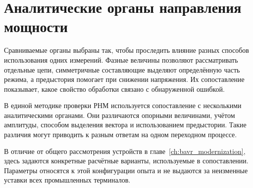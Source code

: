 \section{Аналитические органы направления мощности}
\label{sec:ch5_analytical_organs}

Сравниваемые органы выбраны так, чтобы проследить влияние разных
способов использования одних измерений. Фазные величины позволяют
рассматривать отдельные цепи, симметричные составляющие выделяют
определённую часть режима, а предыстория помогает при снижении
напряжения. Их сопоставление показывает, какое свойство обработки
связано с обнаруженной ошибкой.

{}

{}



В единой методике проверки РНМ используется
сопоставление с несколькими аналитическими органами.
Они различаются опорными величинами,
учётом амплитуды, способом выделения вектора
и использованием предыстории.
Такие различия могут приводить
к разным ответам на одном переходном процессе.

В отличие от общего рассмотрения устройств
в главе~\ref{ch:bavr_modernization},
здесь задаются конкретные расчётные варианты,
используемые в сопоставлении.
Параметры относятся к этой конфигурации опыта
и не выдаются за неизменные уставки
всех промышленных терминалов.

